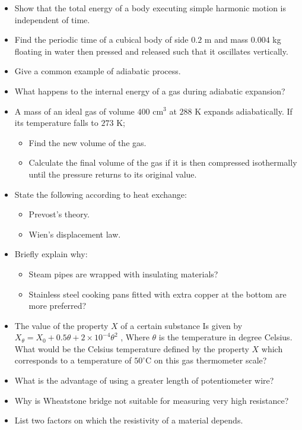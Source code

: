 \documentclass{article}
\begin{document}
\begin{itemize}
\begin{itemize}
\end{itemize}
\item Show that the total energy of a body executing simple harmonic motion is independent of time. 
\item Find the periodic time of a cubical body of side $ 0.2$ m and mass $ 0.004$ kg floating in water then pressed and released such that it oscillates vertically. 
\item Give a common example of adiabatic process. 
\item What happens to the internal energy of a gas during adiabatic expansion?
\item A mass of an ideal gas of volume $ 400$ cm$ ^{3}$ at $ 288$ K expands adiabatically. If its temperature falls to $ 273$ K;
 \begin{itemize}
\item Find the new volume of the gas. 
\item Calculate the final volume of the gas if it is then compressed isothermally until the pressure returns to its original value.
\end{itemize}
\item State the following according to heat exchange:
 \begin{itemize}
\item  Prevost’s theory. 
\item Wien's displacement law.
\end{itemize}
\item Briefly explain why:
 \begin{itemize}
\item Steam pipes are wrapped with insulating materials?
\item Stainless steel cooking pans fitted with extra copper at the bottom are more preferred?
\end{itemize}
\item The value of the property $ X$ of a certain substance Is given by $ X_{\theta}=X_{0}+0.5\theta +2\times 10^{-4}\theta ^{2}$  , Where $ \theta $ is the temperature in degree Celsius. What would be the Celsius temperature defined by the property $ X$ which corresponds to a temperature of $ 50^{\circ}$C on this gas thermometer scale? 
\item What is the advantage of using a greater length of potentiometer wire?
\item Why is Wheatstone bridge not suitable for measuring very high resistance?
\item List two factors on which the resistivity of a material depends. 

\end{itemize}
\end{document}

